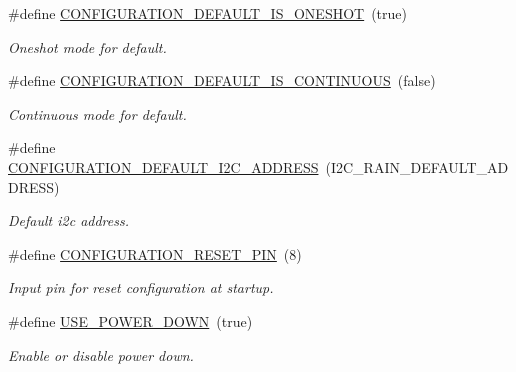 \begin{DoxyCompactItemize}
\#define \hyperlink{i2c-rain-config_8h_a5c4024778a87026713c77babd50c06e8}{C\+O\+N\+F\+I\+G\+U\+R\+A\+T\+I\+O\+N\+\_\+\+D\+E\+F\+A\+U\+L\+T\+\_\+\+I\+S\+\_\+\+O\+N\+E\+S\+H\+OT}~(true)
\begin{DoxyCompactList}\small\item\em Oneshot mode for default. \end{DoxyCompactList}\item 
\mbox{\label{i2c-rain-config_8h_a21819dc42c8c71731e30c99bcf8b0f76}} 
\#define \hyperlink{i2c-rain-config_8h_a21819dc42c8c71731e30c99bcf8b0f76}{C\+O\+N\+F\+I\+G\+U\+R\+A\+T\+I\+O\+N\+\_\+\+D\+E\+F\+A\+U\+L\+T\+\_\+\+I\+S\+\_\+\+C\+O\+N\+T\+I\+N\+U\+O\+US}~(false)
\begin{DoxyCompactList}\small\item\em Continuous mode for default. \end{DoxyCompactList}\item 
\mbox{\label{i2c-rain-config_8h_a25fb304ef264a84353f1d4cfc61128e9}} 
\#define \hyperlink{i2c-rain-config_8h_a25fb304ef264a84353f1d4cfc61128e9}{C\+O\+N\+F\+I\+G\+U\+R\+A\+T\+I\+O\+N\+\_\+\+D\+E\+F\+A\+U\+L\+T\+\_\+\+I2\+C\+\_\+\+A\+D\+D\+R\+E\+SS}~(I2\+C\+\_\+\+R\+A\+I\+N\+\_\+\+D\+E\+F\+A\+U\+L\+T\+\_\+\+A\+D\+D\+R\+E\+SS)
\begin{DoxyCompactList}\small\item\em Default i2c address. \end{DoxyCompactList}\item 
\mbox{\label{i2c-rain-config_8h_ae90da4786d4ba14563681879dba4d39c}} 
\#define \hyperlink{i2c-rain-config_8h_ae90da4786d4ba14563681879dba4d39c}{C\+O\+N\+F\+I\+G\+U\+R\+A\+T\+I\+O\+N\+\_\+\+R\+E\+S\+E\+T\+\_\+\+P\+IN}~(8)
\begin{DoxyCompactList}\small\item\em Input pin for reset configuration at startup. \end{DoxyCompactList}\item 
\mbox{\label{i2c-rain-config_8h_a9ace81994cbeb6153f9dd5adf0e6dbee}} 
\#define \hyperlink{i2c-rain-config_8h_a9ace81994cbeb6153f9dd5adf0e6dbee}{U\+S\+E\+\_\+\+P\+O\+W\+E\+R\+\_\+\+D\+O\+WN}~(true)
\begin{DoxyCompactList}\small\item\em Enable or disable power down. \end{DoxyCompactList}\item 

\end{DoxyCompactItemize}
